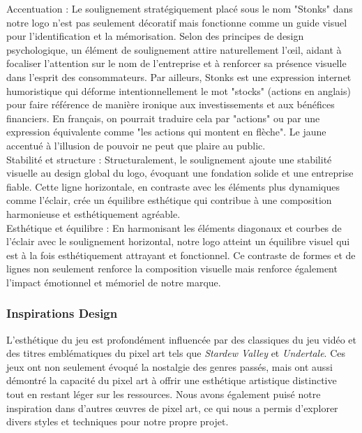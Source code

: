 Accentuation : Le soulignement stratégiquement placé sous le nom "Stonks" dans notre logo n'est pas seulement décoratif mais fonctionne comme un guide visuel pour l'identification et la mémorisation.
Selon des principes de design psychologique, un élément de soulignement attire naturellement l'œil, aidant à focaliser l'attention sur le nom de l'entreprise et à renforcer sa présence visuelle dans l'esprit des consommateurs.
Par ailleurs, Stonks est une expression internet humoristique qui déforme intentionnellement le mot "stocks" (actions en anglais) pour faire référence de manière ironique aux investissements et aux bénéfices financiers.
En français, on pourrait traduire cela par "actions" ou par une expression équivalente comme "les actions qui montent en flèche". Le jaune accentué à l'illusion de pouvoir ne peut que plaire au public.
\\

Stabilité et structure : Structuralement, le soulignement ajoute une stabilité visuelle au design global du logo, évoquant une fondation solide et une entreprise fiable.
Cette ligne horizontale, en contraste avec les éléments plus dynamiques comme l'éclair, crée un équilibre esthétique qui contribue à une composition harmonieuse et esthétiquement agréable.
\\

Esthétique et équilibre : En harmonisant les éléments diagonaux et courbes de l'éclair avec le soulignement horizontal, notre logo atteint un équilibre visuel qui est à la fois esthétiquement attrayant et fonctionnel.
Ce contraste de formes et de lignes non seulement renforce la composition visuelle mais renforce également l'impact émotionnel et mémoriel de notre marque.


\subsubsection{Inspirations Design}

L'esthétique du jeu \gameName est profondément influencée par des classiques du jeu vidéo et des titres emblématiques du pixel art tels que \textit{Stardew Valley} 
et \textit{Undertale}.
Ces jeux ont non seulement évoqué la nostalgie des genres passés, mais ont aussi démontré la capacité du pixel art à offrir une esthétique artistique distinctive 
tout en restant léger sur les ressources.
Nous avons également puisé notre inspiration dans d'autres œuvres de pixel art, ce qui nous a permis d'explorer divers styles et techniques pour notre propre projet.
\\

